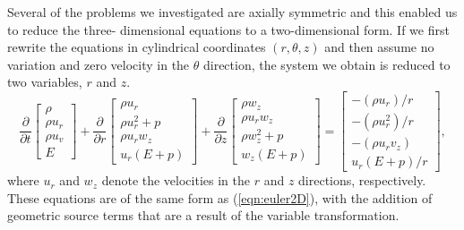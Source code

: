 \documentclass{article}
\begin{document}
Several of the problems we investigated are axially symmetric and this enabled us to reduce the three-
dimensional equations to a two-dimensional form.  If we first rewrite the equations in cylindrical 
coordinates $(r,\theta,z)$ and then assume no variation and zero velocity in the $\theta$ direction, the 
system we obtain is reduced to two variables, $r$ and $z$.  
\begin{equation}
	\frac{\partial}{\partial t} \left[ \begin{array}{c} \rho \\ \rho u_r \\ \rho u_v \\ E \end{array} \right] +
	\frac{\partial}{\partial r} \left[ \begin{array}{c} \rho u_r \\ \rho u_r^2 + p \\ \rho u_r w_z \\ u_r(E+p) 
\end{array} \right] + 
	\frac{\partial}{\partial z} \left[ \begin{array}{c} \rho w_z \\ \rho u_r w_z\\ \rho w_z^2 + p \\ w_z(E+p) 
\end{array} \right ] = 
	\left[ \begin{array}{c} -(\rho u_r)/r \\ -(\rho u_r^2)/r \\ -(\rho u_r v_z) \\ u_r(E+p)/r \end{array} \right ],  
	\label{eqn:2daxisymeuler}
\end{equation}
where $u_r$ and $w_z$ denote the velocities in the $r$ and $z$ directions, respectively.  These 
equations are of the same form as (\ref{eqn:euler2D}), with the addition of geometric source terms that 
are a result of the variable transformation.
\end{document}

